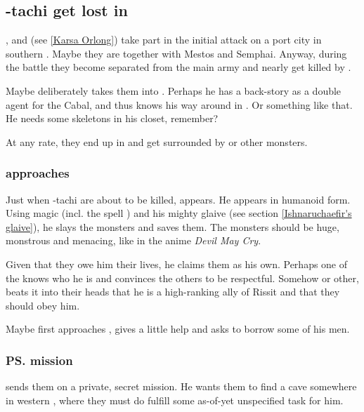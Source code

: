 \subsection{\Shilred-tachi get lost in \Nyx}
\Shilred{}, \Dzasselid{} and \KarsaOrlong{} (see \ref{Karsa Orlong}) take part in the initial attack on a port city in southern \Scyrum. Maybe they are together with Mestos and Semphai. Anyway, during the battle they become separated from the main army and nearly get killed by \banes. %

Maybe \Dzasselid{} deliberately takes them into \Nyx. Perhaps he has a back-story as a double agent for the Cabal, and thus knows his way around in \Nyx. Or something like that. He needs some skeletons in his closet, remember?

At any rate, they end up in \Nyx{} and get surrounded by \banes{} or other monsters. 






\subsubsection{\Ishnaruchaefir{} approaches}
Just when \Shilred-tachi are about to be killed, \Ishnaruchaefir{} appears. He appears in humanoid form. Using magic (incl. the spell ) and his mighty glaive (see section \ref{Ishnaruchaefir's glaive}), he slays the monsters and saves them. The monsters should be huge, monstrous and menacing, like in the anime \emph{Devil May Cry}. 

Given that they owe him their lives, he claims them as his own. Perhaps one of the \Gisshorns{} knows who he is and convinces the others to be respectful. Somehow or other, \Ishnaruchaefir{} beats it into their heads that he is a high-ranking ally of Rissit and that they should obey him. 

Maybe \Ishnaruchaefir{} first approaches \Narkiza{}, gives a little help and asks to borrow some of his men. 






\subsubsection{\ps{\Ishnaruchaefir} mission}
\Ishnaruchaefir{} sends them on a private, secret mission. He wants them to find a cave somewhere in western \Velcad{}, where they must do fulfill some as-of-yet unspecified task for him. 

